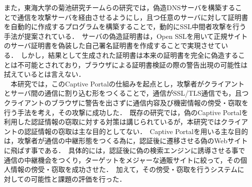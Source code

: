 \documentclass[dvipdfmx,twocolumn,9pt]{jsarticle}
\begin{document}
        また，東海大学の菊池研究チームらの研究\cite{FakeSslAndDnsServer}では，偽造DNSサーバを構築することで通信を攻撃サーバを経由させるようにし，且つ任意のサーバに対して証明書を自動的に作成するプログラムを構築することで，動的にSSL中間者攻撃を行う手法が提案されている．\
        サーバの偽造証明書は，Open SSLを用いて正規サイトのサーバ証明書を偽装した自己署名証明書を作成することで実現させている．\
        しかし，結果として生成された証明書は本来の証明書を完全に偽造することは不可能とされており，ブラウザによる証明書検証の際の警告出現の可能性は拭えているとは言えない．\\
        　本研究では，このCaptive Portalの仕組みを起点とし，攻撃者がクライアントとサーバ間の通信に割り込む形をつくることで，通信がSSL/TLS通信でも，且つクライアントのブラウザに警告を出さずに通信内容及び機密情報の傍受・窃取を行う手法を考え，その攻撃に成功した．\
        既存の研究では，偽のCaptive Portalを利用した認証情報の窃取に対する対策は講じられているが，本研究ではクライアントの認証情報の窃取は主な目的としてない．\
        Captive Portalを用いる主な目的は，攻撃者が通信の中継形態をつくる為に，認証後に遷移させる偽のWebサイトに飛ばす事である．\
        具体的には，認証後に偽の検索エンジンに誘導させる事で通信の中継機会をつくり，ターゲットをメジャーな通販サイトに絞って，その個人情報の傍受・窃取を成功させた．\
        加えて，その傍受・窃取を行うシステムに対しての可能性と課題の評価を行った．\
\end{document}
